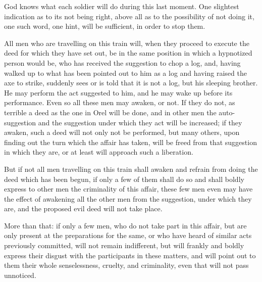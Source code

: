 \documentclass{book}
\begin{document}
God knows what each soldier will do during this last moment. One slightest indication as to its not being right, above all as to the possibility of not doing it, one such word, one hint, will be sufficient, in order to stop them.

All men who are travelling on this train will, when they proceed to execute the deed for which they have set out, be in the same position in which a hypnotized person would be, who has received the suggestion to chop a log, and, having walked up to what has been pointed out to him as a log and having raised the axe to strike, suddenly sees or is told that it is not a log, but his sleeping brother. He may perform the act suggested to him, and he may wake up before its performance. Even so all these men may awaken, or not. If they do not, as terrible a deed as the one in Orel will be done, and in other men the auto-suggestion and the suggestion under which they act will be increased; if they awaken, such a deed will not only not be performed, but many others, upon finding out the turn which the affair has taken, will be freed from that suggestion in which they are, or at least will approach such a liberation.

But if not all men travelling on this train shall awaken and refrain from doing the deed which has been begun, if only a few of them shall do so and shall boldly express to other men the criminality of this affair, these few men even may have the effect of awakening all the other men from the suggestion, under which they are, and the proposed evil deed will not take place.

More than that: if only a few men, who do not take part in this affair, but are only present at the preparations for the same, or who have heard of similar acts previously committed, will not remain indifferent, but will frankly and boldly express their disgust with the participants in these matters, and will point out to them their whole senselessness, cruelty, and criminality, even that will not pass unnoticed.
\end{document}

